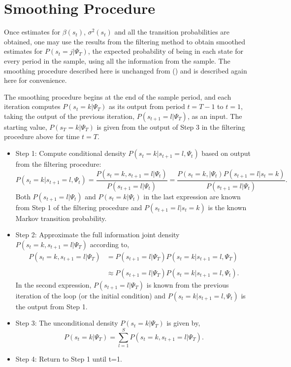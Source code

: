 \documentclass[12pt]{article}
\newcommand{\bi}{\begin{itemize}}
\newcommand{\ei}{\end{itemize}}
\newcommand{\bdm}{\begin{displaymath}}
\newcommand{\edm}{\end{displaymath}}
\newcommand{\citee}[1]{\citename{#1} (\citeyear{#1})}
\newcommand{\appsection}[1]
{
\section{#1}
\renewcommand{\theequation}{\thesection\arabic{equation}}
\setcounter{equation}{0}
}
\begin{document}
\appsection{Smoothing Procedure}\label{s:asmooth}
Once estimates for $\beta(s_t)$, $\sigma^2(s_t)$ and all the transition probabilities are obtained, one may use the results from the filtering method to obtain smoothed estimates for $P(s_t=j | \Psi_T)$, the expected probability of being in each state for every period in the sample, using all the information from the sample.  The smoothing procedure described here is unchanged from \citee{hamilton1989} and is described again here for convenience.  

The smoothing procedure begins at the end of the sample period, and each iteration computes $P(s_t=k|\Psi_T)$ as its output from period $t=T-1$ to $t=1$, taking the output of the previous iteration, $P(s_{t+1}=l|\Psi_T)$, as an input.  The starting value, $P(s_T=k | \Psi_T)$ is given from the output of Step 3 in the filtering procedure above for time $t=T$.

\bi
\item Step 1: Compute conditional density $P(s_t=k | s_{t+1}=l, \Psi_t)$ based on output from the filtering procedure:
\bdm P(s_t=k | s_{t+1}=l, \Psi_t) = \frac{P(s_t=k, s_{t+1}=l | \Psi_t)}{P(s_{t+1}=l | \Psi_t)} = \frac{P(s_t=k, | \Psi_t) P(s_{t+1}=l | s_t=k)}{P(s_{t+1}=l | \Psi_t)}. \edm
Both $P(s_{t+1}=l | \Psi_t)$ and $P(s_{t}=k | \Psi_t)$ in the last expression are known from Step 1 of the filtering procedure and $P(s_{t+1}=l | s_t=k)$ is the known Markov transition probability.
\item Step 2: Approximate the full information joint density $P(s_t=k, s_{t+1}=l | \Psi_T)$ according to,
\bdm \begin{array}{cc} P(s_t=k, s_{t+1}=l | \Psi_T) & = P(s_{t+1}=l | \Psi_T) P(s_t=k | s_{t+1}=l, \Psi_T) \\ \\
 & \approx P(s_{t+1}=l | \Psi_T) P(s_t=k | s_{t+1}=l, \Psi_t). \end{array} \edm
In the second expression, $P(s_{t+1}=l | \Psi_T)$ is known from the previous iteration of the loop (or the initial condition) and $P(s_t=k | s_{t+1}=l, \Psi_t)$ is the output from Step 1.
\item Step 3: The unconditional density $P(s_t=k|\Psi_T)$ is given by,
\bdm P(s_t=k|\Psi_T) = \sum_{l=1}^{S} P(s_t=k, s_{t+1}=l | \Psi_T). \edm
\item Step 4: Return to Step 1 until t=1.
\ei

\newpage
\nocite{*}


\newpage
\end{document}
